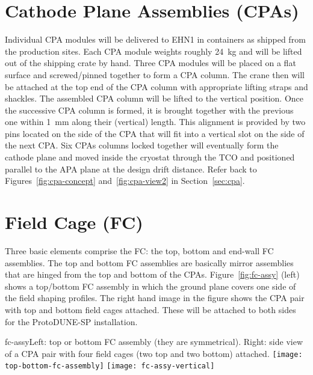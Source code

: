 \section{Cathode Plane Assemblies (CPAs)}

Individual CPA modules will be delivered to EHN1 in containers as shipped from the production sites.  Each CPA module weights roughly 24~kg and will be lifted out of the shipping crate by hand. %
%
%
Three CPA modules will be placed on a flat surface and screwed/pinned together to form a CPA column. 
  The crane  
  then will be attached at the top end of the CPA column with appropriate lifting straps and shackles.  The assembled CPA column will be lifted to the vertical position.  
Once the successive CPA column is formed, it is brought together with the previous one within 1~mm along their (vertical) length. 
This alignment is provided by two pins located on the side of the CPA that will fit into a vertical slot on the side of the next CPA. Six CPAs columns locked together will eventually form the cathode plane and moved inside the cryostat through the TCO and positioned parallel to the APA plane at the design drift distance. Refer back to Figures~\ref{fig:cpa-concept} and~\ref{fig:cpa-view2} in Section~\ref{sec:cpa}.


\section{Field Cage (FC)}


Three basic elements comprise the FC: the top, bottom and end-wall FC assemblies.  
The top and bottom FC assemblies are basically mirror assemblies that are hinged from the top and bottom of the CPAs. %
Figure~\ref{fig:fc-assy} (left) shows a top/bottom FC assembly in which the ground plane covers one side of the field shaping profiles.  
The right hand image in the figure shows the CPA pair with top and bottom field cages attached.
These will be attached to both sides for the ProtoDUNE-SP installation.  
\begin{cdrfigure}{fc-assy}{Left: top or bottom FC assembly (they are symmetrical). Right: side view of a CPA pair with four field cages (two top and two bottom) attached.}
\texttt{[image: top-bottom-fc-assembly]}
\texttt{[image: fc-assy-vertical]}
\end{cdrfigure}

